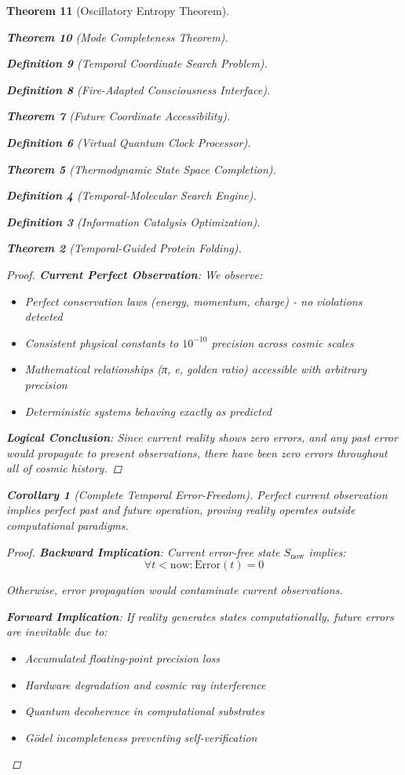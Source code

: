 \documentclass[12pt,a4paper]{article}
\newtheorem{theorem}{Theorem}[section]
\newtheorem{corollary}[theorem]{Corollary}
\newtheorem{definition}[theorem]{Definition}
\begin{document}
\begin{theorem}[Oscillatory Entropy Theorem]
\begin{theorem}[Mode Completeness Theorem]
\begin{enumerate}
\begin{definition}[Temporal Coordinate Search Problem]
\begin{algorithm}
\begin{definition}[Fire-Adapted Consciousness Interface]
\begin{theorem}[Future Coordinate Accessibility]
\begin{definition}[Virtual Quantum Clock Processor]
\begin{itemize}
\begin{itemize}
\begin{theorem}[Thermodynamic State Space Completion]
\begin{definition}[Temporal-Molecular Search Engine]
\begin{definition}[Information Catalysis Optimization]
\begin{algorithm}
\begin{theorem}[Temporal-Guided Protein Folding]
\begin{table}[h]
\begin{proof}
\textbf{Current Perfect Observation}: We observe:
\begin{itemize}
    \item Perfect conservation laws (energy, momentum, charge) - no violations detected
    \item Consistent physical constants to $10^{-10}$ precision across cosmic scales
    \item Mathematical relationships (π, e, golden ratio) accessible with arbitrary precision
    \item Deterministic systems behaving exactly as predicted
\end{itemize}

\textbf{Logical Conclusion}: Since current reality shows zero errors, and any past error would propagate to present observations, there have been zero errors throughout all of cosmic history.
\end{proof}

\begin{corollary}[Complete Temporal Error-Freedom]
Perfect current observation implies perfect past and future operation, proving reality operates outside computational paradigms.
\end{corollary}

\begin{proof}
\textbf{Backward Implication}: Current error-free state $S_{\text{now}}$ implies:
$$\forall t < \text{now}: \text{Error}(t) = 0$$

Otherwise, error propagation would contaminate current observations.

\textbf{Forward Implication}: If reality generates states computationally, future errors are inevitable due to:
\begin{itemize}
    \item Accumulated floating-point precision loss
    \item Hardware degradation and cosmic ray interference
    \item Quantum decoherence in computational substrates
    \item Gödel incompleteness preventing self-verification
\end{itemize}


\end{proof}
\end{table}
\end{theorem}
\end{algorithm}
\end{definition}
\end{definition}
\end{theorem}
\end{itemize}
\end{itemize}
\end{definition}
\end{theorem}
\end{definition}
\end{algorithm}
\end{definition}
\end{enumerate}
\end{theorem}
\end{theorem}
\end{document}
